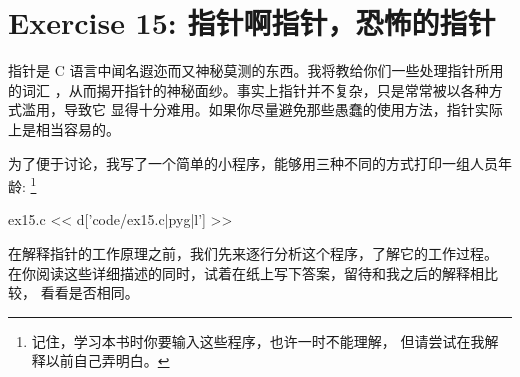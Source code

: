 ﻿\chapter{Exercise 15: 指针啊指针，恐怖的指针}

指针是 C 语言中闻名遐迩而又神秘莫测的东西。我将教给你们一些处理指针所用的词汇
，从而揭开指针的神秘面纱。事实上指针并不复杂，只是常常被以各种方式滥用，导致它
显得十分难用。如果你尽量避免那些愚蠢的使用方法，指针实际上是相当容易的。

为了便于讨论，我写了一个简单的小程序，能够用三种不同的方式打印一组人员年龄:
\footnote{记住，学习本书时你要输入这些程序，也许一时不能理解，
但请尝试在我解释以前自己弄明白。}

\begin{code}{ex15.c}
<< d['code/ex15.c|pyg|l'] >>
\end{code}
在解释指针的工作原理之前，我们先来逐行分析这个程序，了解它的工作过程。
在你阅读这些详细描述的同时，试着在纸上写下答案，留待和我之后的解释相比较，
看看是否相同。

